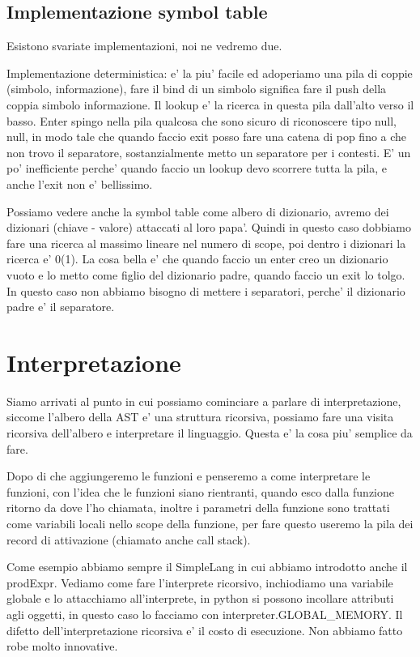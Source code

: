 \subsection{Implementazione symbol table}
Esistono svariate implementazioni, noi ne vedremo due.

Implementazione deterministica: e' la piu' facile ed adoperiamo una pila di coppie (simbolo, informazione), fare il bind di un simbolo significa fare il push della coppia simbolo informazione. Il lookup e' la ricerca in questa pila dall'alto verso il basso. Enter spingo nella pila qualcosa che sono sicuro di riconoscere tipo null, null, in modo tale che quando faccio exit posso fare una catena di pop fino a che non trovo il separatore, sostanzialmente metto un separatore per i contesti. E' un po' inefficiente perche' quando faccio un lookup devo scorrere tutta la pila, e anche l'exit non e' bellissimo.

Possiamo vedere anche la symbol table come albero di dizionario, avremo dei dizionari (chiave - valore) attaccati al loro papa'. Quindi in questo caso dobbiamo fare una ricerca al massimo lineare nel numero di scope, poi dentro i dizionari la ricerca e'  0(1). La cosa bella e' che quando faccio un enter creo un dizionario vuoto e lo metto come figlio del dizionario padre, quando faccio un exit lo tolgo. In questo caso non abbiamo bisogno di mettere i separatori, perche' il dizionario padre e' il separatore.

\section{Interpretazione}
Siamo arrivati al punto in cui possiamo cominciare a parlare di interpretazione, siccome l'albero della AST e' una struttura ricorsiva, possiamo fare una visita ricorsiva dell'albero e interpretare il linguaggio. Questa e' la cosa piu' semplice da fare.

Dopo di che aggiungeremo le funzioni e penseremo a come interpretare le funzioni, con l'idea che le funzioni siano rientranti, quando esco dalla funzione ritorno da dove l'ho chiamata, inoltre i parametri della funzione sono trattati come variabili locali nello scope della funzione, per fare questo useremo la pila dei record di attivazione (chiamato anche call stack).

Come esempio abbiamo sempre il SimpleLang in cui abbiamo introdotto anche il prodExpr. Vediamo come fare l'interprete ricorsivo, inchiodiamo una variabile globale e lo attacchiamo all'interprete, in python si possono incollare attributi agli oggetti, in questo caso lo facciamo con interpreter.GLOBAL\_MEMORY.
Il difetto dell'interpretazione ricorsiva e' il costo di esecuzione. Non abbiamo fatto robe molto innovative.

